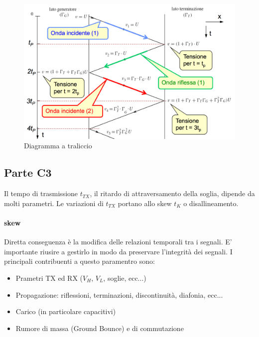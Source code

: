 \documentclass[12pt]{article}
\begin{document}
\begin{figure}[!hp]
  \includegraphics[width=\textwidth]{images/tralicc.png}
  \caption{Diagramma a traliccio}
  \label{fig:tralicc}
\end{figure}

\subsection{Parte C3}\label{c3} %
Il tempo di trasmissione $t_{TX}$, il ritardo di attraversamento della soglia, dipende da molti parametri. Le variazioni di $t_{TX}$ portano allo skew $t_{K}$ o disallineamento.

\paragraph{skew} Diretta conseguenza è la modifica delle relazioni temporali tra i segnali. E' importante riusire a gestirlo in modo da preservare l'integrità dei segnali. I principali contribuenti a questo paramentro sono:
\begin{itemize}
  \item Prametri TX ed RX ($V_{H}$, $V_{L}$, soglie, ecc...)
  \item Propagazione: riflessioni, terminazioni, discontinuità, diafonia, ecc...
  \item Carico (in particolare capacitivi)
  \item Rumore di massa (Ground Bounce) e di commutazione
\end{itemize} %
\end{document}
